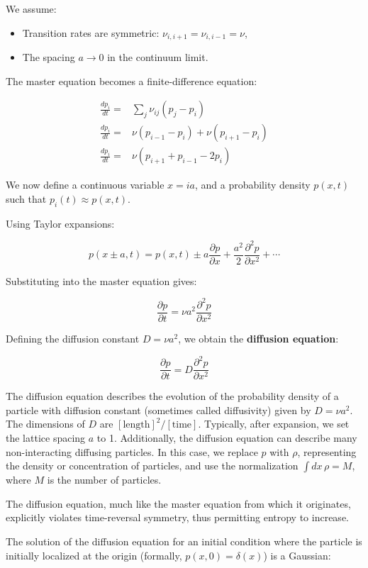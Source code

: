 \documentclass[
  letterpaper,
  enabledeprecatedfontcommands]{report}
\begin{document}
We assume:

\begin{itemize}
\item
  Transition rates are symmetric: \(\nu_{i, i+1} = \nu_{i, i-1} = \nu\),
\item
  The spacing \(a\to 0\) in the continuum limit.
\end{itemize}

The master equation becomes a finite-difference equation:

\[
\begin{aligned}
\frac{dp_i}{dt} =  &\sum_j\nu_{ij}(p_j-p_i)\\
\frac{dp_i}{dt} =  &\nu(p_{i-1}-p_i) + \nu(p_{i+1} - p_i)\\
\frac{dp_i}{dt} =  &\nu(p_{i+1} + p_{i-1} - 2p_i)
\end{aligned}
\]

We now define a continuous variable \(x = i a\), and a probability
density \(p(x, t)\) such that \(p_i(t) \approx p(x, t)\).

Using Taylor expansions:

\[
p(x \pm a, t) = p(x, t) \pm a \frac{\partial p}{\partial x} + \frac{a^2}{2} \frac{\partial^2 p}{\partial x^2} + \cdots
\]

Substituting into the master equation gives:

\[
\frac{\partial p}{\partial t} = 
\nu a^2 \frac{\partial^2 p}{\partial x^2}
\]

Defining the diffusion constant \(D = \nu a^2\), we obtain the
\textbf{diffusion equation}:

\[
\frac{\partial p}{\partial t} = D \frac{\partial^2 p}{\partial x^2}
\]

The diffusion equation describes the evolution of the probability
density of a particle with diffusion constant (sometimes called
diffusivity) given by \(D = \nu a^2\). The dimensions of \(D\) are
\([\text{length}]^2/[\text{time}]\). Typically, after expansion, we set
the lattice spacing \(a\) to 1. Additionally, the diffusion equation can
describe many non-interacting diffusing particles. In this case, we
replace \(p\) with \(\rho\), representing the density or concentration
of particles, and use the normalization \(\int dx \, \rho = M\), where
\(M\) is the number of particles.

The diffusion equation, much like the master equation from which it
originates, explicitly violates time-reversal symmetry, thus permitting
entropy to increase.

The solution of the diffusion equation for an initial condition where
the particle is initially localized at the origin (formally,
\(p(x,0) = \delta(x)\)) is a Gaussian:
\end{document}
